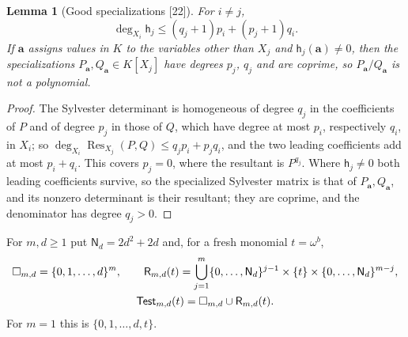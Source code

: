 \documentclass[11pt,letterpaper]{article}
\numberwithin{equation}{section}
\newtheorem{lemma}[lemma]{Lemma}
\theoremstyle{definition}
\theoremstyle{remark}
\theoremstyle{plain}
\newcommand{\src}[1]{\textup{\textsf{[#1]}}}
\begin{document}
\begin{lemma}[Good specializations \src{22}]\label{osq:ft:lem:resultant}
For $i\ne j$,
\begin{equation}\label{osq:ft:eq:sharpD}
 \deg_{X_i}\mathsf h_j\le(q_j+1)p_i+(p_j+1)q_i .
\end{equation}
If $\mathbf a$ assigns values in $K$ to the variables other than $X_j$ and $\mathsf h_j(\mathbf a)\ne0$, then the specializations
$P_{\mathbf a},Q_{\mathbf a}\in K[X_j]$ have degrees $p_j$, $q_j$ and are coprime, so $P_{\mathbf a}/Q_{\mathbf a}$ is not a polynomial.
\end{lemma}
\begin{proof}
The Sylvester determinant is homogeneous of degree $q_j$ in the coefficients of $P$ and of degree $p_j$ in those of $Q$, which have degree at most $p_i$,
respectively $q_i$, in $X_i$; so $\deg_{X_i}\operatorname{Res}_{X_j}(P,Q)\le q_jp_i+p_jq_i$, and the two leading coefficients add at most $p_i+q_i$. This
covers $p_j=0$, where the resultant is $P^{q_j}$. Where $\mathsf h_j\ne0$ both leading coefficients survive, so the specialized Sylvester matrix is that of
$P_{\mathbf a},Q_{\mathbf a}$, and its nonzero determinant is their resultant; they are coprime, and the denominator has degree $q_j>0$.
\end{proof}

For $m,d\ge1$ put $\mathsf N_d=2d^2+2d$ and, for a fresh monomial $t=\omega^b$,
\begin{gather}
 \square_{m,d}=\{0,1,\dots,d\}^m,\qquad
 \mathsf R_{m,d}(t)=\bigcup_{j=1}^m\{0,\dots,\mathsf N_d\}^{j-1}\times\{t\}\times\{0,\dots,\mathsf N_d\}^{m-j},\label{osq:ft:eq:testset}\\
 \mathsf{Test}_{m,d}(t)=\square_{m,d}\cup\mathsf R_{m,d}(t).\notag
\end{gather}
For $m=1$ this is $\{0,1,\dots,d,t\}$.
\end{document}
